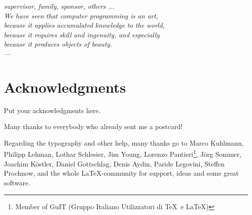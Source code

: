 
\begin{flushright}{\slshape    
	supervisor, family, sponsor, others ... \\
    We have seen that computer programming is an art, \\ 
    because it applies accumulated knowledge to the world, \\ 
    because it requires skill and ingenuity, and especially \\
    because it produces objects of beauty.} \\ \medskip
    ---  \citep{knuth:1974}
\end{flushright}



\bigskip

\begingroup
\let\clearpage\relax
\let\cleardoublepage\relax
\let\cleardoublepage\relax
\chapter*{Acknowledgments}
Put your acknowledgments here.

Many thanks to everybody who already sent me a postcard!

Regarding the typography and other help, many thanks go to Marco 
Kuhlmann, Philipp Lehman, Lothar Schlesier, Jim Young, Lorenzo 
Pantieri\footnote{Member of GuIT (Gruppo Italiano Utilizzatori 
di \TeX\ e \LaTeX )}, J\"org Sommer, Joachim K\"ostler, Daniel 
Gottschlag, Denis Aydin, Paride Legovini, Steffen Prochnow, 
and the whole \LaTeX-community for support, ideas and some great 
software.

\endgroup



